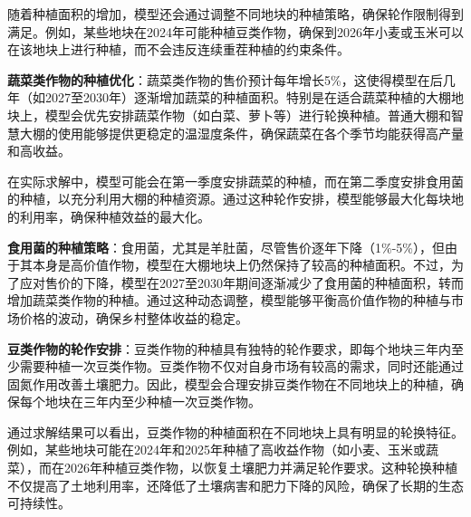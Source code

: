 \documentclass[12pt,a4paper]{nmmcm}
\begin{document}
随着种植面积的增加，模型还会通过调整不同地块的种植策略，确保轮作限制得到满足。例如，某些地块在2024年可能种植豆类作物，确保到2026年小麦或玉米可以在该地块上进行种植，而不会违反连续重茬种植的约束条件。

\textbf{蔬菜类作物的种植优化}：蔬菜类作物的售价预计每年增长5\%，这使得模型在后几年（如2027至2030年）逐渐增加蔬菜的种植面积。特别是在适合蔬菜种植的大棚地块上，模型会优先安排蔬菜作物（如白菜、萝卜等）进行轮换种植。普通大棚和智慧大棚的使用能够提供更稳定的温湿度条件，确保蔬菜在各个季节均能获得高产量和高收益。

在实际求解中，模型可能会在第一季度安排蔬菜的种植，而在第二季度安排食用菌的种植，以充分利用大棚的种植资源。通过这种轮作安排，模型能够最大化每块地的利用率，确保种植效益的最大化。

\textbf{食用菌的种植策略}：食用菌，尤其是羊肚菌，尽管售价逐年下降（1\%-5\%），但由于其本身是高价值作物，模型在大棚地块上仍然保持了较高的种植面积。不过，为了应对售价的下降，模型在2027至2030年期间逐渐减少了食用菌的种植面积，转而增加蔬菜类作物的种植。通过这种动态调整，模型能够平衡高价值作物的种植与市场价格的波动，确保乡村整体收益的稳定。

\textbf{豆类作物的轮作安排}：豆类作物的种植具有独特的轮作要求，即每个地块三年内至少需要种植一次豆类作物。豆类作物不仅对自身市场有较高的需求，同时还能通过固氮作用改善土壤肥力。因此，模型会合理安排豆类作物在不同地块上的种植，确保每个地块在三年内至少种植一次豆类作物。

通过求解结果可以看出，豆类作物的种植面积在不同地块上具有明显的轮换特征。例如，某些地块可能在2024年和2025年种植了高收益作物（如小麦、玉米或蔬菜），而在2026年种植豆类作物，以恢复土壤肥力并满足轮作要求。这种轮换种植不仅提高了土地利用率，还降低了土壤病害和肥力下降的风险，确保了长期的生态可持续性。



\end{document}
